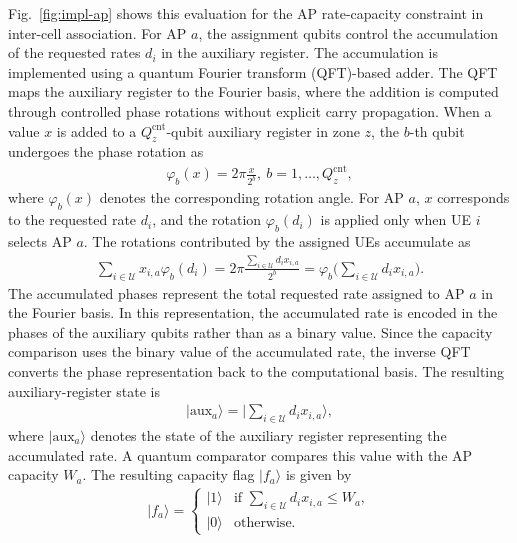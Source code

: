 \documentclass[journal]{IEEEtran}
\newcommand{\ket}[1]{\lvert #1 \rangle}
\begin{document}
{{Fig.~\ref{fig:impl-ap} shows this evaluation for the AP rate-capacity constraint in inter-cell association. For AP $a$, the assignment qubits control the accumulation of the requested rates $d_i$ in the auxiliary register. The accumulation is implemented using a quantum Fourier transform (QFT)-based adder. The QFT maps the auxiliary
register to the Fourier basis, where the addition is computed through controlled phase rotations without explicit carry propagation. When a value $x$ is added to a $Q_z^{\mathrm{cnt}}$-qubit auxiliary
register in zone $z$, the $b$-th qubit undergoes the phase rotation as
\begin{align}
\varphi_b(x)
=2\pi\frac{x}{2^b},~b=1,\ldots,Q_z^{\mathrm{cnt}},
\label{eq:phase-angle}
\end{align}
where $\varphi_b(x)$ denotes the corresponding rotation angle. For AP $a$, $x$ corresponds to the requested rate $d_i$, and the rotation $\varphi_b(d_i)$ is applied only when UE $i$ selects AP $a$. The rotations contributed by the assigned UEs accumulate as
\begin{align}
\sum_{i\in\mathcal{U}}x_{i,a}\varphi_b(d_i)=2\pi\frac{\sum_{i\in\mathcal{U}}d_i x_{i,a}}{2^b}
=\varphi_b\Big(\sum_{i\in\mathcal{U}}d_i x_{i,a}\Big).
\label{eq:ap-phase-sum}
\end{align}
The accumulated phases represent the total requested rate assigned to AP $a$ in the Fourier basis. In this representation, the accumulated rate is encoded in the phases of the auxiliary qubits rather than as a binary value. Since the capacity comparison uses the binary value of the accumulated rate, the inverse QFT converts the phase representation back to the computational basis. The resulting auxiliary-register state is
\begin{align}
\ket{\mathrm{aux}_a}
=\Big|\sum_{i\in\mathcal{U}}d_i x_{i,a}\Big\rangle,
\label{eq:ap-load-state}
\end{align}
where $\ket{\mathrm{aux}_a}$ denotes the state of the auxiliary register representing the accumulated rate. A quantum comparator compares this value with the AP capacity $W_a$. The resulting capacity
flag $\ket{f_a}$ is given by
\begin{align}
\ket{f_a}
=\begin{cases}
\ket{1} &\text{if }\sum_{i\in\mathcal{U}}d_i x_{i,a}\leq W_a,\\
\ket{0} & \text{otherwise}.
\end{cases}
\label{eq:ap-capacity-flag}
\end{align}
}}
\end{document}
